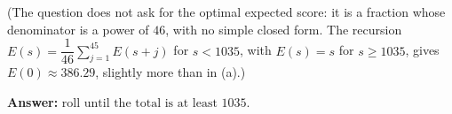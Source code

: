 (The question does not ask for the optimal expected score: it is a fraction whose denominator is a power of $46$, with no simple closed form. The recursion $E(s)=\dfrac1{46}\sum_{j=1}^{45}E(s+j)$ for $s<1035$, with $E(s)=s$ for $s\ge1035$, gives $E(0)\approx386.29$, slightly more than in (a).)

\textbf{Answer:} $\boxed{\text{roll until the total is at least }1035}$.
